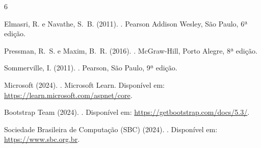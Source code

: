 \documentclass[12pt]{article}
\begin{document}
\begin{thebibliography}{6}

Elmasri, R. e Navathe, S.~B. (2011).
.
\newblock Pearson Addison Wesley, São Paulo, 6ª edição.

Pressman, R.~S. e Maxim, B.~R. (2016).
.
\newblock McGraw-Hill, Porto Alegre, 8ª edição.

Sommerville, I. (2011).
.
\newblock Pearson, São Paulo, 9ª edição.

Microsoft (2024).
.
\newblock Microsoft Learn. Disponível em: \url{https://learn.microsoft.com/aspnet/core}.

Bootstrap Team (2024).
.
\newblock Disponível em: \url{https://getbootstrap.com/docs/5.3/}.

Sociedade Brasileira de Computação (SBC) (2024).
.
\newblock Disponível em: \url{https://www.sbc.org.br}.

\end{thebibliography}
\end{document}
